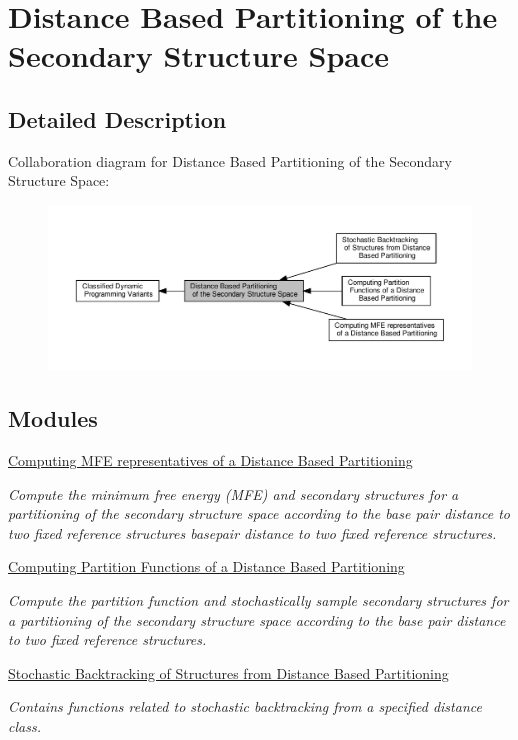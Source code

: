 \hypertarget{group__kl__neighborhood}{}\section{Distance Based Partitioning of the Secondary Structure Space}
\label{group__kl__neighborhood}


\subsection{Detailed Description}
Collaboration diagram for Distance Based Partitioning of the Secondary Structure Space\+:
\nopagebreak
\begin{figure}[H]
\begin{center}
\leavevmode
\includegraphics[width=350pt]{group__kl__neighborhood}
\end{center}
\end{figure}
\subsection*{Modules}
\begin{DoxyCompactItemize}
\item 
\hyperlink{group__kl__neighborhood__mfe}{Computing M\+F\+E representatives of a Distance Based Partitioning}
\begin{DoxyCompactList}\small\item\em Compute the minimum free energy (M\+FE) and secondary structures for a partitioning of the secondary structure space according to the base pair distance to two fixed reference structures basepair distance to two fixed reference structures. \end{DoxyCompactList}\item 
\hyperlink{group__kl__neighborhood__pf}{Computing Partition Functions of a Distance Based Partitioning}
\begin{DoxyCompactList}\small\item\em Compute the partition function and stochastically sample secondary structures for a partitioning of the secondary structure space according to the base pair distance to two fixed reference structures. \end{DoxyCompactList}\item 
\hyperlink{group__kl__neighborhood__stochbt}{Stochastic Backtracking of Structures from Distance Based Partitioning}
\begin{DoxyCompactList}\small\item\em Contains functions related to stochastic backtracking from a specified distance class. \end{DoxyCompactList}\end{DoxyCompactItemize}
